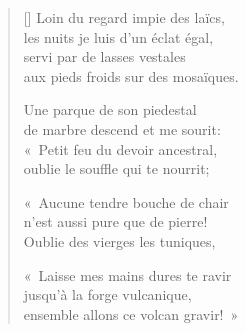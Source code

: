 \documentclass[11pt,a4paper]{article}
\begin{document}
\thispagestyle{empty}


\settowidth{\versewidth}{aux pieds froids sur des mosaïques.}

\bigskip

\begin{verse}[\versewidth]
  Loin du regard impie des laïcs, \\
  les nuits je luis d'un éclat égal, \\
  servi par de lasses vestales \\
  aux pieds froids sur des mosaïques.

  Une parque de son piedestal \\
  de marbre descend et me sourit: \\
  «~Petit feu du devoir ancestral, \\
  oublie le souffle qui te nourrit;

  «~Aucune tendre bouche de chair \\
  n'est aussi pure que de pierre! \\
  Oublie des vierges les tuniques,

  «~Laisse mes mains dures te ravir \\
  jusqu'à la forge vulcanique, \\
  ensemble allons ce volcan gravir!~»
\end{verse}
\end{document}
